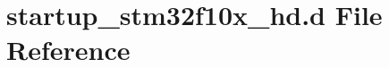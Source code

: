 \hypertarget{startup__stm32f10x__hd_8d}{}\section{startup\+\_\+stm32f10x\+\_\+hd.\+d File Reference}
\label{startup__stm32f10x__hd_8d}
